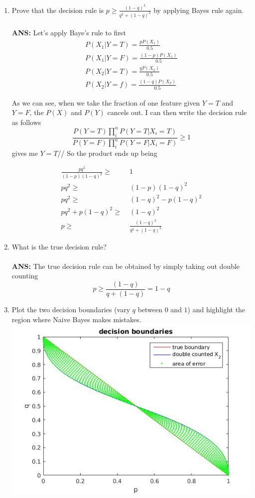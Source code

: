 \begin{enumerate}
  \begin{enumerate}
    \item Prove that the decision rule is $p \ge \frac{(1-q)^2}{q^2 +
      (1-q)^2}$ by applying Bayes rule again.
	\\
  	\\{\bf ANS:}
  	Let's apply Baye's rule to first
  	\begin{align*}
  	P(X_1 | Y = T) = \frac{pP(X_1)}{0.5}\\
  	P(X_1 | Y = F) = \frac{(1-p)P(X_1)}{0.5}\\
  	P(X_2 | Y = T) = \frac{qP(X_2)}{0.5}\\
  	P(X_2 | Y = f) = \frac{(1-q)P(X_2)}{0.5}
  	\end{align*}
  	
  	As we can see, when we take the fraction of one feature given $Y = T$ and $Y = F$, the $P(X)$ and $P(Y)$ cancels out. I can then write the decision rule as follows
  	\[
  	\frac{P(Y=T) \prod_i^n P(Y=T|X_i = T)}{P(Y=F) \prod_i^n P(Y=F|X_i = F)} \geq 1
  	\]
  	gives me $Y=T$//
  	So the product ends up being
  	
  	\begin{align*}
  	\frac{pq^2}{(1-p)(1-q)^2} \geq &\; 1\\
  	pq^2 \geq &\; (1-p)(1-q)^2 \\
  	pq^2 \geq &\; (1-q)^2 - p(1-q)^2 \\
  	pq^2 + p(1-q)^2 \geq &\; (1-q)^2 \\
  	p \geq &\; \frac{(1-q)^2}{q^2 + (1-q)^2}
  	\end{align*}


    \item What is the true decision rule?
\\
\\{\bf ANS:} The true decision rule can be obtained by simply taking out double counting
\[
p \geq \frac{(1-q)}{q + (1-q)} = 1-q
\]

    \item Plot the two decision boundaries (vary $q$ between $0$ and
      $1$) and highlight the region where Naive Bayes makes mistakes.
\includegraphics[scale=0.7]{decision_boundary.jpg}
      
  \end{enumerate}
\end{enumerate}
